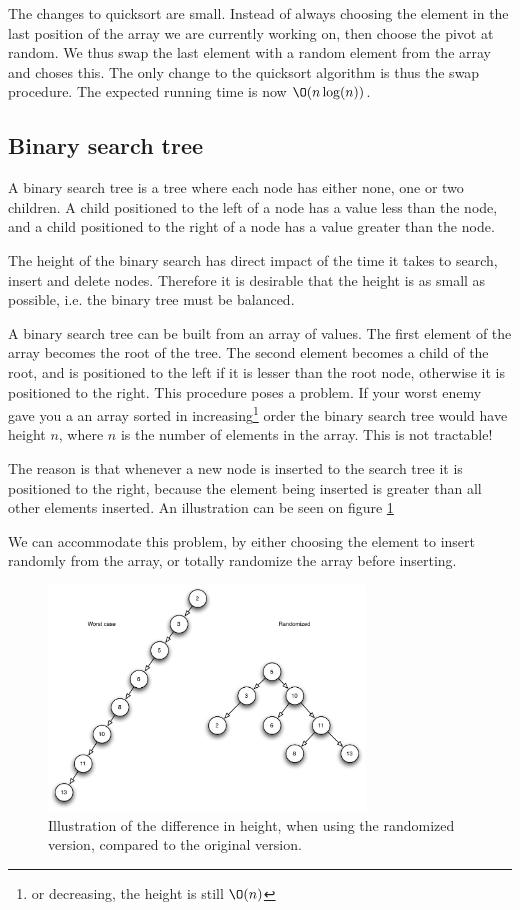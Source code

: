 \documentclass[10pt]{article}
\begin{document}
The changes to quicksort are small. Instead of always choosing the element in the last position of the array we are currently working on, then choose the pivot at random. We thus swap the last element with a random element from the array and choses this. The only change to the quicksort algorithm is thus the swap procedure. The expected running time is now $\O(n\log(n))$.


\subsection{Binary search tree} %
\label{sub:binary_search_tree}
A binary search tree is a tree where each node has either none, one or two children. A child positioned to the left of a node has a value less than the node, and a child positioned to the right of a node has a value greater than the node.

The height of the binary search has direct impact of the time it takes to search, insert and delete nodes. Therefore it is desirable that the height is as small as possible, i.e. the binary tree must be balanced.

A binary search tree can be built from an array of values. The first element of the array becomes the root of the tree. The second element becomes a child of the root, and is positioned to the left if it is lesser than the root node, otherwise it is positioned to the right. This procedure poses a problem. If your worst enemy gave you a an array sorted in increasing\footnote{or decreasing, the height is still $\O(n)$} order the binary search tree would have height $n$, where $n$ is the number of elements in the array. This is not tractable! 

The reason is that whenever a new node is inserted to the search tree it is positioned to the right, because the element being inserted is greater than all other elements inserted. An illustration can be seen on figure \ref{fig11}

We can accommodate this problem, by either choosing the element to insert randomly from the array, or totally randomize the array before inserting.

\begin{figure}[ht]
\centering
\includegraphics[width=0.75\textwidth]{figures/fig11.pdf}
\caption{Illustration of the difference in height, when using the randomized version, compared to the original version.}
\label{fig11}
\end{figure}
\end{document}
